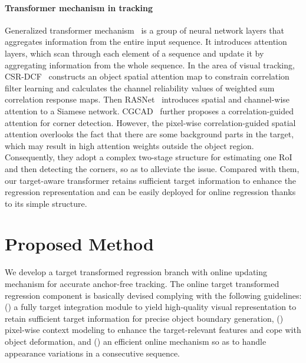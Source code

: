 \documentclass[10pt,twocolumn,letterpaper]{article}
\begin{document}
\paragraph{Transformer mechanism in tracking}
Generalized transformer mechanism~\cite{transformer} is a group of neural network layers that aggregates information from the entire input sequence. It introduces attention layers, which scan through each element of a sequence and update it by aggregating information from the whole sequence. 
In the area of visual tracking, CSR-DCF~\cite{Lukezic_2017_CVPR} constructs an object spatial attention map to constrain correlation filter learning and calculates the channel reliability values of weighted sum correlation
response maps. Then RASNet~\cite{rasnet} introduces spatial and channel-wise attention to a Siamese network. CGCAD~\cite{CGACD} further proposes a correlation-guided attention for corner detection. However, the pixel-wise correlation-guided spatial attention overlooks the fact that there are some background parts in the target, which may result in high attention weights outside the object region.
Consequently, they adopt a complex two-stage structure for estimating one RoI and then detecting the corners, so as to alleviate the issue. 
Compared with them, our target-aware transformer retains sufficient target information to enhance the regression representation and can be easily deployed for online regression thanks to its simple structure.



\section{Proposed Method}

We develop a target transformed regression branch with online updating mechanism for accurate anchor-free tracking. The online target transformed regression component is basically devised complying with the following guidelines:
() a fully target integration module to yield high-quality visual representation to retain sufficient target information for precise object boundary generation, () pixel-wise context modeling to enhance the target-relevant features and cope with object deformation, and () an efficient online mechanism so as to handle appearance variations in a consecutive sequence.
\end{document}
